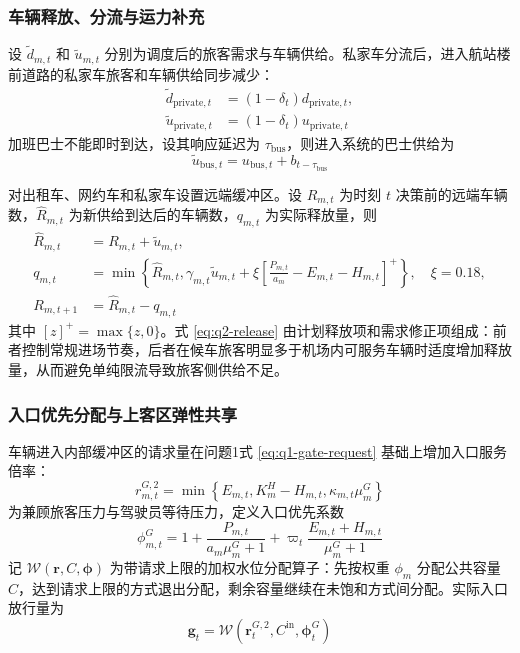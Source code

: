 \documentclass[UTF8,a4paper,11pt,onecolumn,fontset=none]{ctexart}
\begin{document}
\subsubsection{车辆释放、分流与运力补充}

设 $\widetilde d_{m,t}$ 和 $\widetilde u_{m,t}$ 分别为调度后的旅客需求与车辆供给。私家车分流后，进入航站楼前道路的私家车旅客和车辆供给同步减少：
\begin{align}
  \widetilde d_{\mathrm{private},t}
  &=(1-\delta_t)d_{\mathrm{private},t},
  \label{eq:q2-private-demand}\\
  \widetilde u_{\mathrm{private},t}
  &=(1-\delta_t)u_{\mathrm{private},t}
  \label{eq:q2-private-supply}
\end{align}
加班巴士不能即时到达，设其响应延迟为 $\tau_{\mathrm{bus}}$，则进入系统的巴士供给为
\begin{equation}
  \widetilde u_{\mathrm{bus},t}
  =u_{\mathrm{bus},t}+b_{t-\tau_{\mathrm{bus}}}
  \label{eq:q2-bus-supply}
\end{equation}

对出租车、网约车和私家车设置远端缓冲区。设 $R_{m,t}$ 为时刻 $t$ 决策前的远端车辆数，$\widehat R_{m,t}$ 为新供给到达后的车辆数，$q_{m,t}$ 为实际释放量，则
\begin{align}
  \widehat R_{m,t}
  &=R_{m,t}+\widetilde u_{m,t},
  \label{eq:q2-remote-arrival}\\
  q_{m,t}
  &=\min\left\{
  \widehat R_{m,t},
  \gamma_{m,t}\widetilde u_{m,t}
  +\xi\left[
  \frac{P_{m,t}}{a_m}-E_{m,t}-H_{m,t}
  \right]^+
  \right\},
  \quad \xi=0.18,
  \label{eq:q2-release}\\
  R_{m,t+1}
  &=\widehat R_{m,t}-q_{m,t}
  \label{eq:q2-remote-update}
\end{align}
其中 $[z]^+=\max\{z,0\}$。式 \eqref{eq:q2-release} 由计划释放项和需求修正项组成：前者控制常规进场节奏，后者在候车旅客明显多于机场内可服务车辆时适度增加释放量，从而避免单纯限流导致旅客侧供给不足。

\subsubsection{入口优先分配与上客区弹性共享}

车辆进入内部缓冲区的请求量在问题1式 \eqref{eq:q1-gate-request} 基础上增加入口服务倍率：
\begin{equation}
  r_{m,t}^{G,2}
  =\min\left\{
  E_{m,t},
  K_m^H-H_{m,t},
  \kappa_{m,t}\mu_m^G
  \right\}
  \label{eq:q2-gate-request}
\end{equation}
为兼顾旅客压力与驾驶员等待压力，定义入口优先系数
\begin{equation}
  \phi_{m,t}^{G}
  =1+
  \frac{P_{m,t}}{a_m\mu_m^G+1}
  +\varpi_t
  \frac{E_{m,t}+H_{m,t}}{\mu_m^G+1}
  \label{eq:q2-gate-priority}
\end{equation}
记 $\mathcal W(\boldsymbol r,C,\boldsymbol\phi)$ 为带请求上限的加权水位分配算子：先按权重 $\phi_m$ 分配公共容量 $C$，达到请求上限的方式退出分配，剩余容量继续在未饱和方式间分配。实际入口放行量为
\begin{equation}
  \boldsymbol g_t
  =\mathcal W
  \left(
  \boldsymbol r_t^{G,2},
  C^{\mathrm{in}},
  \boldsymbol\phi_t^G
  \right)
  \label{eq:q2-gate-waterfill}
\end{equation}
\end{document}
